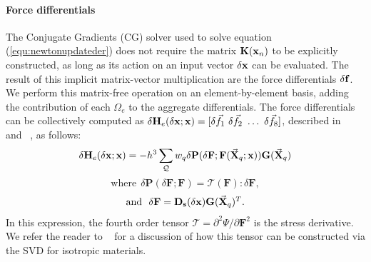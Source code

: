\paragraph{Force differentials} The Conjugate Gradients (CG) solver
used to solve equation (\ref{equ:newtonupdateder}) does not require
the matrix $\mathbf{K}(\hbox{\boldmath $\mathbf x$}_n)$ to be explicitly
constructed, as long as its action on an input vector
$\delta\hbox{\boldmath $\mathbf x$}$ can be evaluated.  The result of this
implicit matrix-vector multiplication are the force differentials
$\delta\hbox{\boldmath $\mathbf f$}$. We perform this matrix-free operation on an
element-by-element basis, adding the contribution of each $\Omega_e$
to the aggregate differentials.  The force differentials can
be collectively computed as
$\delta\mathbf{H}_e(\delta\hbox{\boldmath $\mathbf x$};\hbox{\boldmath $\mathbf x$})=[\delta\vec{f}_1\ \delta\vec{f}_2\ \hdots\
\delta\vec{f}_8]$, described in ~\cite{McAdaZSETTS:2011} and ~\cite{PatteMS:2012}, as
follows:
\begin{equation}
\delta\mathbf{H}_e(\delta\hbox{\boldmath $\mathbf x$};\hbox{\boldmath $\mathbf
    x$})=-h^3\sum_{\mathcal Q} w_q\delta\mathbf{P}(\delta\mathbf{F};\mathbf{F}(\vec{\mathbf
    X}_q;\hbox{\boldmath $\mathbf x$}))\mathbf{G}(\vec{\mathbf X}_q)
\end{equation}
$$
\mbox{where}\ \ \mbox{$\delta\mathbf{P}(\delta\mathbf{F};\mathbf{F})=\mathcal{T}(\mathbf{F}):\delta\mathbf{F}$},
$$
$$
\mbox{and}\ \
\mbox{$\delta\mathbf{F}=\mathbf{D_s}(\delta\hbox{\boldmath $\mathbf
    x$})\mathbf{G}(\vec{\mathbf X}_q)^T$}.
$$
In this expression, the fourth order tensor
$\mathcal{T}=\partial^2\Psi/\partial\mathbf{F}^2$ is the stress
derivative. We refer the reader to ~\cite{TeranSIF:2005} for a
discussion of how this tensor can be constructed via the SVD for
isotropic materials.


